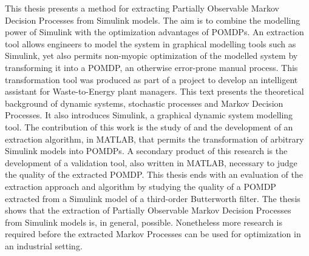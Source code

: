 This thesis presents a method for extracting Partially Observable Markov Decision Processes from Simulink models. The aim is to combine the modelling power of Simulink with the optimization advantages of POMDPs. An extraction tool allows engineers to model the system in graphical modelling tools such as Simulink, yet also permits non-myopic optimization of the modelled system by transforming it into a POMDP, an otherwise error-prone manual process. This transformation tool was produced as part of a project to develop an intelligent assistant for Waste-to-Energy plant managers. This text presents the theoretical background of dynamic systems, stochastic processes and Markov Decision Processes. It also introduces Simulink, a graphical dynamic system modelling tool. The contribution of this work is the study of and the development of an extraction algorithm, in MATLAB, that permits the transformation of arbitrary Simulink models into POMDPs. A secondary product of this research is the development of a validation tool, also written in MATLAB, necessary to judge the quality of the extracted POMDP. This thesis ends with an evaluation of the extraction approach and algorithm by studying the quality of a POMDP extracted from a Simulink model of a third-order Butterworth filter. The thesis shows that the extraction of Partially Observable Markov Decision Processes from Simulink models is, in general, possible. Nonetheless more research is required before the extracted Markov Processes can be used for optimization in an industrial setting.

%
%
